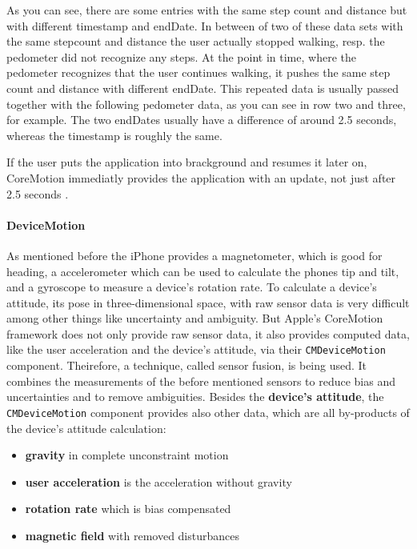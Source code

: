 As you can see, there are some entries with the same step count and distance but with different timestamp and endDate.
In between of two of these data sets with the same stepcount and distance the user actually stopped walking, resp. the pedometer did not recognize any steps.
At the point in time, where the pedometer recognizes that the user continues walking, it pushes the same step count and distance with different endDate.
This repeated data is usually passed together with the following pedometer data, as you can see in row two and three, for example.
The two endDates usually have a difference of around 2.5 seconds, whereas the timestamp is roughly the same.

If the user puts the application into brackground and resumes it later on, CoreMotion immediatly provides the application with an update, not just after 2.5 seconds \cite{wwdc_2014}.


\paragraph{DeviceMotion}

As mentioned before the iPhone provides a magnetometer, which is good for heading, a accelerometer which can be used to calculate the phones tip and tilt, and a gyroscope to measure a device's rotation rate.
To calculate a device's attitude, its pose in three-dimensional space, with raw sensor data is very difficult among other things like uncertainty and ambiguity.
But Apple's CoreMotion framework does not only provide raw sensor data, it also provides computed data, like the user acceleration and the device's attitude, via their \texttt{CMDeviceMotion} component.
Theirefore, a technique, called sensor fusion, is being used.
It combines the measurements of the before mentioned sensors to reduce bias and uncertainties and to remove ambiguities.
Besides the \textbf{device's attitude}, the \texttt{CMDeviceMotion} component provides also other data, which are all by-products of the device's attitude calculation:
\begin{itemize}
  \item \textbf{gravity} in complete unconstraint motion
  \item \textbf{user acceleration} is the acceleration without gravity
  \item \textbf{rotation rate} which is bias compensated
  \item \textbf{magnetic field} with removed disturbances
\end{itemize}

